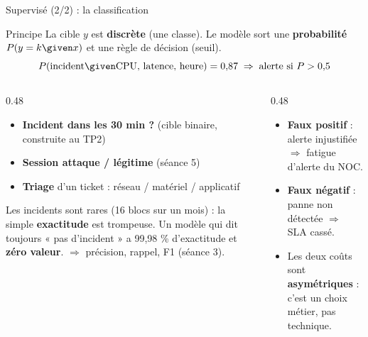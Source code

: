 \begin{frame}{Supervisé (2/2) : la classification}
\footnotesize%
\begin{block}{Principe}
La cible $y$ est \textbf{discrète} (une classe). Le modèle sort une \textbf{probabilité}
$P(y = k \given x)$ et une règle de décision (seuil).
\[
P(\text{incident} \given \text{CPU, latence, heure}) = 0{,}87
\;\Rightarrow\; \text{alerte si } P > 0{,}5
\]
\end{block}
\begin{columns}[t]
\begin{column}{0.48\textwidth}
\begin{ebox}
\begin{itemize}
\item \textbf{Incident dans les 30 min ?} (cible binaire, construite au TP2)
\item \textbf{Session attaque / légitime} (séance 5)
\item \textbf{Triage} d'un ticket : réseau / matériel / applicatif
\end{itemize}
\end{ebox}
\begin{wbox}
Les incidents sont rares (16 blocs sur un mois) : la simple
\textbf{exactitude} est trompeuse. Un modèle qui dit toujours
« pas d'incident » a 99,98 \% d'exactitude et \textbf{zéro valeur}.
$\Rightarrow$ précision, rappel, F1 (séance 3).
\end{wbox}
\end{column}
\begin{column}{0.48\textwidth}
\begin{kbox}
\begin{itemize}
\item \textbf{Faux positif} : alerte injustifiée $\Rightarrow$ fatigue d'alerte du NOC.
\item \textbf{Faux négatif} : panne non détectée $\Rightarrow$ SLA cassé.
\item Les deux coûts sont \textbf{asymétriques} : c'est un choix métier, pas technique.
\end{itemize}
\end{kbox}
\end{column}
\end{columns}
\end{frame}

